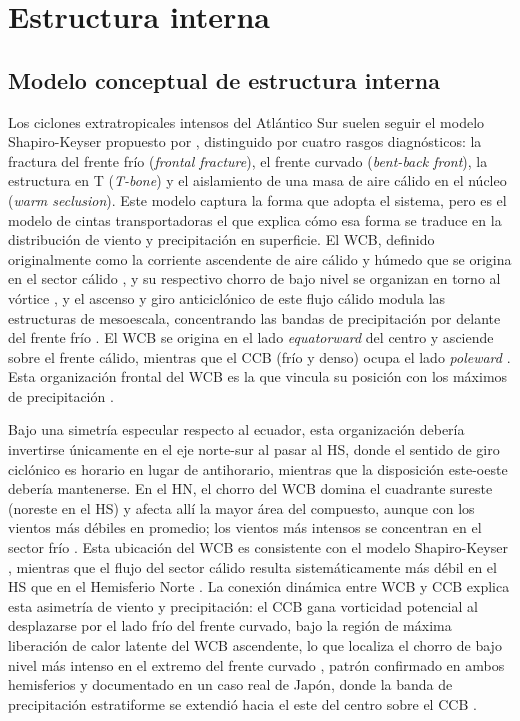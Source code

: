 \section{Estructura interna}\label{sec:tb_evolucion}

\subsection{Modelo conceptual de estructura interna}\label{subsec:tb_modelos}

Los ciclones extratropicales intensos del Atlántico Sur suelen seguir el modelo Shapiro-Keyser propuesto por \citet{shapiro1990life}, distinguido por cuatro rasgos diagnósticos: la fractura del frente frío (\textit{frontal fracture}), el frente curvado (\textit{bent-back front}), la estructura en T (\textit{T-bone}) y el aislamiento de una masa de aire cálido en el núcleo (\textit{warm seclusion}). 
Este modelo captura la forma que adopta el sistema, pero es el modelo de cintas transportadoras el que explica cómo esa forma se traduce en la distribución de viento y precipitación en superficie. 
El WCB, definido originalmente como la corriente ascendente de aire cálido y húmedo que se origina en el sector cálido \citep{carlson1980airflow}, y su respectivo chorro de bajo nivel se organizan en torno al vórtice \citep{browning1986conceptual}, y el ascenso y giro anticiclónico de este flujo cálido modula las estructuras de mesoescala, concentrando las bandas de precipitación por delante del frente frío \citep{coll2024lagrangian}.
El WCB se origina en el lado \textit{equatorward} del centro y asciende sobre el frente cálido, mientras que el CCB (frío y denso) ocupa el lado  \textit{poleward} \citep{dacre2023climatology}. 
Esta organización frontal del WCB es la que vincula su posición con los máximos de precipitación \citep{catto2015fronts}.

Bajo una simetría especular respecto al ecuador, esta organización debería invertirse únicamente en el eje norte-sur al pasar al HS, donde el sentido de giro ciclónico es horario en lugar de antihorario, mientras que la disposición este-oeste debería mantenerse. 
En el HN, el chorro del WCB domina el cuadrante sureste (noreste en el HS) y afecta allí la mayor área del compuesto, aunque con los vientos más débiles en promedio; los vientos más intensos se concentran en el sector frío \citep{eisenstein2023identification}. Esta ubicación del WCB es consistente con el modelo Shapiro-Keyser \citep{catto2010climate}, mientras que el flujo del sector cálido resulta sistemáticamente más débil en el HS que en el Hemisferio Norte \citep{hodges2011comparison}.
La conexión dinámica entre WCB y CCB explica esta asimetría de viento y precipitación: el CCB gana vorticidad potencial al desplazarse por el lado frío del frente curvado, bajo la región de máxima liberación de calor latente del WCB ascendente, lo que localiza el chorro de bajo nivel más intenso en el extremo del frente curvado \citep{schemm2014linkage}, patrón confirmado en ambos hemisferios \citep{priestley2022improved} y documentado en un caso real de Japón, donde la banda de precipitación estratiforme se extendió hacia el este del centro sobre el CCB \citep{sawada2021heavy}.

